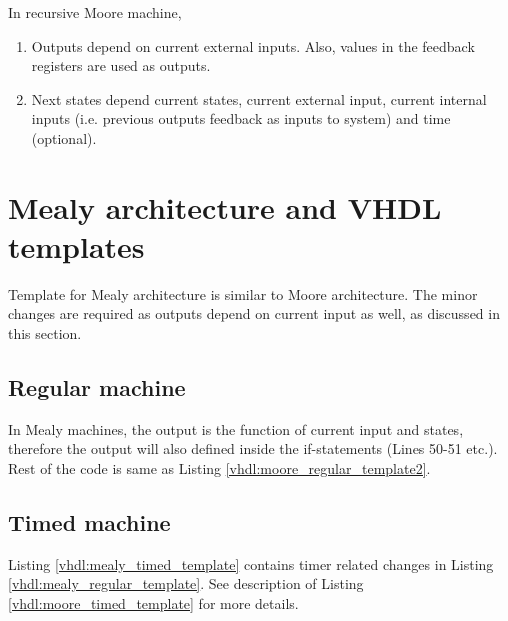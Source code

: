 \begin{noNumBox}
	In recursive Moore machine, 
	\begin{enumerate}
		\item Outputs depend on current external inputs. Also, values in the feedback registers are used as outputs.
		\item Next states depend current states, current external input, current internal inputs (i.e. previous outputs feedback as inputs to system) and time (optional).
	\end{enumerate}
\end{noNumBox}





\section{Mealy architecture and VHDL templates} \label{sec:MealyTemplates}
Template for Mealy architecture is similar to Moore architecture. The minor changes are required as outputs depend on current input as well, as discussed in this section.
\subsection{Regular machine}
In Mealy machines, the output is the function of current input and states, therefore the output will also defined inside the if-statements (Lines 50-51 etc.). Rest of the code is same as Listing \ref{vhdl:moore_regular_template2}. 



\subsection{Timed machine}
Listing \ref{vhdl:mealy_timed_template} contains timer related changes in Listing \ref{vhdl:mealy_regular_template}. See description of Listing \ref{vhdl:moore_timed_template} for more details. 




